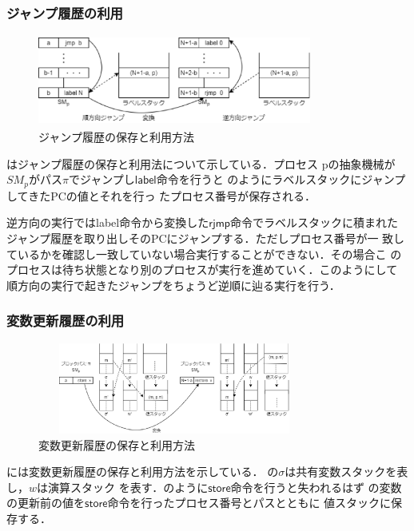 \documentclass[submit,PRO]{ipsj}
\newcommand{\bcode}[1]{$\mathsf{#1}$}
\begin{document}
\subsubsection{ジャンプ履歴の利用}

\begin{figure}[tb]
\includegraphics[height=3.0cm,width=9.0cm]{jmp.eps}
\caption{ジャンプ履歴の保存と利用方法}
\label{fig:jmp}
\end{figure}

はジャンプ履歴の保存と利用法について示している．プロセス
pの抽象機械が$SM_p$がパス$\pi$でジャンプし\bcode{label}命令を行うと
のようにラベルスタックにジャンプしてきたPCの値とそれを行っ
たプロセス番号が保存される．

逆方向の実行ではlabel命令から変換した\bcode{rjmp}命令でラベルスタックに積まれた
ジャンプ履歴を取り出しそのPCにジャンプする．ただしプロセス番号が一
致しているかを確認し一致していない場合実行することができない．その場合こ
のプロセスは待ち状態となり別のプロセスが実行を進めていく．このようにして
順方向の実行で起きたジャンプをちょうど逆順に辿る実行を行う．

\subsubsection{変数更新履歴の利用}

\begin{figure}[tb]
\includegraphics[height=3.0cm,width=9.0cm]{store.eps}
\caption{変数更新履歴の保存と利用方法}
\label{fig:store}
\end{figure}

には変数更新履歴の保存と利用方法を示している．
の$\sigma$は共有変数スタックを表し，$w$は演算スタック
を表す．のように\bcode{store}命令を行うと失われるはず
の変数の更新前の値を\bcode{store}命令を行ったプロセス番号とパスとともに
値スタックに保存する．
\end{document}
